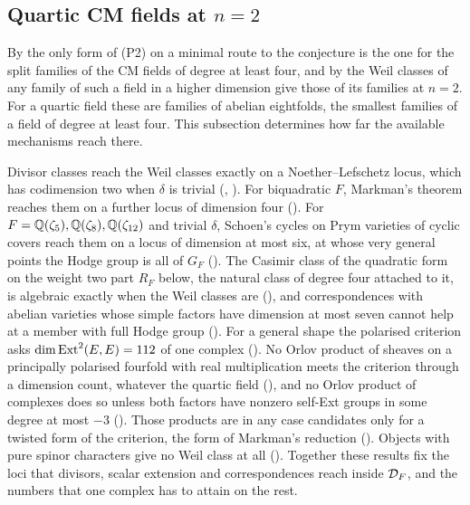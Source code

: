 \subsection{Quartic CM fields at \texorpdfstring{$n=2$}{n=2}}
\label{ssec:quartic}

By \cite[Theorem~2.70(ii)]{paperIII} the only form of (P2) on a minimal route to the
conjecture is the one for the split families of the CM fields of degree at
least four, and by \cite[Proposition~2.13(i)]{paperIII} the Weil classes of any family of
such a field in a higher dimension give those of its families at $n=2$. For a
quartic field these are families of abelian eightfolds, the smallest
families of a field of degree at least four. This subsection determines how
far the available mechanisms reach there.

Divisor classes reach the Weil classes exactly on a Noether--Lefschetz locus,
which has codimension two when $\delta$ is trivial (,
). For biquadratic $F$, Markman's theorem reaches them
on a further locus of dimension four (). For
$F=\mathbb{Q}(\zeta_{5}),\mathbb{Q}(\zeta_{8}),\mathbb{Q}(\zeta_{12})$ and trivial $\delta$,
Schoen's cycles on Prym varieties of cyclic covers reach them on a locus of
dimension at most six, at whose very general points the Hodge group is all of
$G_{F}$ (). The Casimir class of the quadratic form on
the weight two part $R_{F}$ below, the natural class of degree four attached
to it, is algebraic exactly when the Weil classes are
(), and correspondences with abelian varieties whose
simple factors have dimension at most seven cannot help at a member with full
Hodge group (). For a general shape the polarised
criterion asks $\dim\operatorname{Ext}^{2}(E,E)=112$ of one complex
(). No Orlov product of sheaves on a principally
polarised fourfold with real multiplication meets the criterion through a
dimension count, whatever the quartic field (),
and no Orlov product of complexes does so unless both factors have nonzero self-Ext
groups in some degree at most $-3$ (). Those products
are in any case candidates only for a twisted form of the criterion, the form
of Markman's reduction (). Objects with pure
spinor characters give no Weil class at all ().
Together these results fix the loci that
divisors, scalar extension and correspondences reach inside $\mathcal{D}_{F}$, and
the numbers that one complex has to attain on the rest.

